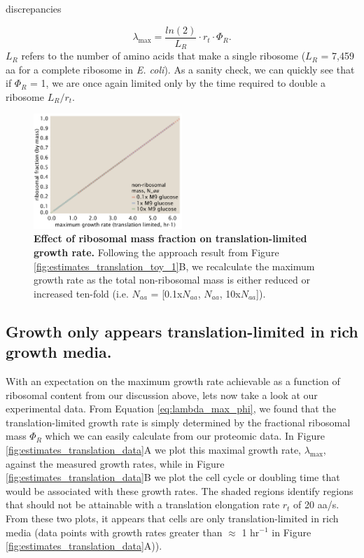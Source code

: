 discrepancies \documentclass[11pt, letterpaper]{article}
\begin{document}
\begin{equation}
\lambda_{\text{max}} =  \frac{ln(2)} {L_R} \cdot r_t \cdot \Phi_R.
\label{eq:lambda_max_phi}
\end{equation}
$L_R$ refers to the number of amino acids that make a single
ribosome ($L_R$ = 7,459 aa for a complete ribosome in {\it E. coli}). As a sanity check, we can quickly
see that if $\Phi_R$ = 1, we are once again limited only by the time required to
double a ribosome $L_R / r_t$.

\begin{figure}[H]
		\centering
    \includegraphics[width=0.5\textwidth]{../../code/figures/SI/estimates_translation_ribo_frac.pdf}
  \caption{{\bf Effect of ribosomal mass fraction on translation-limited growth rate.} Following the approach
	result from Figure \ref{fig:estimates_translation_toy_1}B, we recalculate the maximum growth rate as
	the total non-ribosomal mass is either reduced or increased ten-fold (i.e. $N_{aa}$ = [0.1x$N_{aa}$, $N_{aa}$, 10x$N_{aa}$]).}
  \label{fig:estimates_translation_ribo_frac}
\end{figure}


\subsection{Growth only appears translation-limited in rich growth media.}

With an expectation on the maximum growth rate achievable as a function of
ribosomal content from our discussion above, lets now take a look at our experimental
data. From Equation \ref{eq:lambda_max_phi}, we found that the
translation-limited growth  rate is simply determined by the fractional
ribosomal mass $\Phi_R$ which we can easily calculate from our proteomic data.   In Figure
\ref{fig:estimates_translation_data}A we plot this maximal growth rate,
$\lambda_{\text{max}}$, against the measured growth rates, while in Figure
\ref{fig:estimates_translation_data}B we plot the cell cycle or doubling time that would be
associated with these growth rates. The shaded regions identify regions that
should not be attainable with a translation elongation rate $r_t$ of 20 aa/s.
From these two plots, it appears that cells are only translation-limited in rich
media (data points with growth rates greater than $\approx$ 1 hr$^{-1}$ in Figure
\ref{fig:estimates_translation_data}A)).
\end{document}
